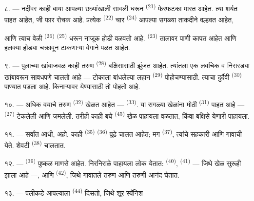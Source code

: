 \VUsaut{4.4mm}
\VUsaut{3.4mm}

८. --- नदीवर काही बाया आपल्या छत्र्यांखाली सावली धरून 
\textsuperscript{(21)} फेरफटका मारत आहेत. त्या शर्यत पाहत आहेत, जी फार रोचक आहे.
प्रत्येक  \textsuperscript{(22)} चार 
\textsuperscript{(24)} आपल्या सगळ्या ताकदीने वल्हवत आहेत,

आणि त्याच वेळी  \textsuperscript{(26)} 
\textsuperscript{(25)} धरून नाजूक होडी वळवतो आहे. 
\textsuperscript{(23)} तालावर पाणी कापत आहेत आणि हलक्या होड्या चक्रावून टाकणाऱ्या
वेगाने पळत आहेत.

९. --- पुलाच्या खांबाजवळ काही तरुण 
\textsuperscript{(28)} बक्षिसासाठी झुंजत आहेत. त्यांतला एक लवचिक व निसरड्या
खांबावरून सावधपणे चालतो आहे --- टोकाला बांधलेल्या लहान 
\textsuperscript{(29)} पोहोचण्यासाठी. त्याचा दुर्दैवी 
\textsuperscript{(30)} पाण्यात पडला आहे. किनाऱ्यावर येण्यासाठी तो पोहतो आहे.

१०. --- अधिक वयाचे तरुण  \textsuperscript{(32)} खेळत आहेत ---
 \textsuperscript{(33)}. या सगळ्या खेळांना मोठी 
\textsuperscript{(31)} पाहत आहे ---  \textsuperscript{(27)}
 टेकलेली आणि  जमलेली. तरीही काही बघे
 \textsuperscript{(45)} खेळ पाहायला वळतात, किंवा
बक्षिसे  येणारी  पाहायला.

११. --- सर्वांत आधी, अहो, काही  \textsuperscript{(35)}
 \textsuperscript{(36)} पुढे चालत आहेत; मग 
\textsuperscript{(37)}, त्यांचे सहकारी आणि गावाची  येते.
शेवटी  \textsuperscript{(38)} चालतात.

\VUsaut{5.0mm}
\VUsaut{3.6mm}

१२. ---  \textsuperscript{(39)} पुष्कळ माणसे आहेत.
निरनिराळे  पाहायला लोक येतात: 
\textsuperscript{(40)},  \textsuperscript{(41)} --- जिथे खेळ सुरूही
झाला आहे ---, आणि  \textsuperscript{(42)}, जिथे गावातले तरुण
आणि तरुणी  आनंद घेतात.

१३. --- पलीकडे आपल्याला  \textsuperscript{(44)} दिसतो, जिथे शूर
स्पॅनिश 

